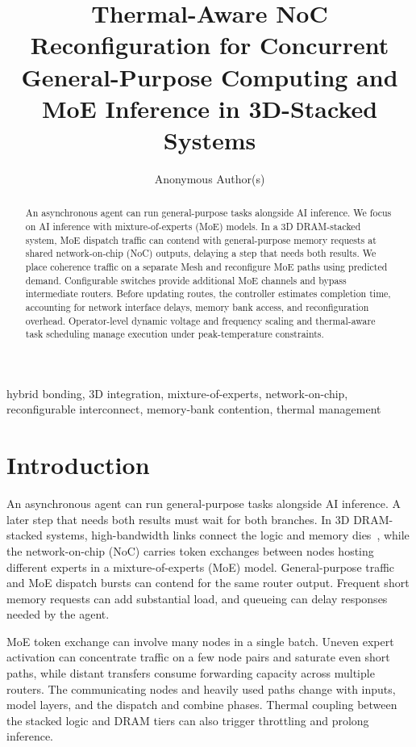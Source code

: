 \documentclass[conference,10pt]{IEEEtran}
\title{Thermal-Aware NoC Reconfiguration for Concurrent General-Purpose Computing and MoE Inference in 3D-Stacked Systems}
\author{Anonymous Author(s)}
\begin{document}
\maketitle

\begin{abstract}
An asynchronous agent can run general-purpose tasks alongside AI inference. We focus on AI inference with mixture-of-experts (MoE) models. In a 3D DRAM-stacked system, MoE dispatch traffic can contend with general-purpose memory requests at shared network-on-chip (NoC) outputs, delaying a step that needs both results. We place coherence traffic on a separate Mesh and reconfigure MoE paths using predicted demand. Configurable switches provide additional MoE channels and bypass intermediate routers. Before updating routes, the controller estimates completion time, accounting for network interface delays, memory bank access, and reconfiguration overhead. Operator-level dynamic voltage and frequency scaling and thermal-aware task scheduling manage execution under peak-temperature constraints.
\end{abstract}

\begin{IEEEkeywords}
hybrid bonding, 3D integration, mixture-of-experts, network-on-chip,
reconfigurable interconnect, memory-bank contention, thermal management
\end{IEEEkeywords}
\raggedbottom

\section{Introduction}
\label{sec:introduction}

An asynchronous agent can run general-purpose tasks alongside AI inference.
A later step that needs both results must wait for both branches. In 3D
DRAM-stacked systems, high-bandwidth links connect the logic and memory
dies~\cite{li2026helios}, while the network-on-chip (NoC) carries token
exchanges between nodes hosting different experts in a mixture-of-experts
(MoE) model. General-purpose traffic and MoE dispatch bursts can contend for
the same router output. Frequent short memory requests can add substantial
load, and queueing can delay responses needed by the agent.

MoE token exchange can involve many nodes in a single batch. Uneven expert
activation can concentrate traffic on a few node pairs and saturate even
short paths, while distant transfers consume forwarding capacity across
multiple routers. The communicating nodes and heavily used paths change with
inputs, model layers, and the dispatch and combine phases. Thermal coupling
between the stacked logic and DRAM tiers can also trigger throttling and
prolong inference.
\end{document}
